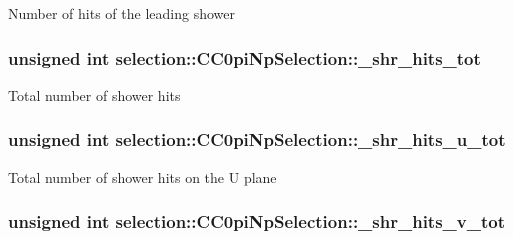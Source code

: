 Number of hits of the leading shower \hypertarget{classselection_1_1CC0piNpSelection_aa6e7162371e3e343df001f0afc8a20b8}{
\subsubsection[{\-\_\-shr\-\_\-hits\-\_\-tot}]{\setlength{\rightskip}{0pt plus 5cm}unsigned int selection\-::\-C\-C0pi\-Np\-Selection\-::\-\_\-shr\-\_\-hits\-\_\-tot\hspace{0.3cm}{\ttfamily [private]}}}\label{classselection_1_1CC0piNpSelection_aa6e7162371e3e343df001f0afc8a20b8}
Total number of shower hits \hypertarget{classselection_1_1CC0piNpSelection_afba4a31f84c2f125323b90f007bda1c6}{
\subsubsection[{\-\_\-shr\-\_\-hits\-\_\-u\-\_\-tot}]{\setlength{\rightskip}{0pt plus 5cm}unsigned int selection\-::\-C\-C0pi\-Np\-Selection\-::\-\_\-shr\-\_\-hits\-\_\-u\-\_\-tot\hspace{0.3cm}{\ttfamily [private]}}}\label{classselection_1_1CC0piNpSelection_afba4a31f84c2f125323b90f007bda1c6}
Total number of shower hits on the U plane \hypertarget{classselection_1_1CC0piNpSelection_ab6aaf4282fa9d2e5971e162c66901227}{
\subsubsection[{\-\_\-shr\-\_\-hits\-\_\-v\-\_\-tot}]{\setlength{\rightskip}{0pt plus 5cm}unsigned int selection\-::\-C\-C0pi\-Np\-Selection\-::\-\_\-shr\-\_\-hits\-\_\-v\-\_\-tot\hspace{0.3cm}{\ttfamily [private]}}}\label{classselection_1_1CC0piNpSelection_ab6aaf4282fa9d2e5971e162c66901227}
